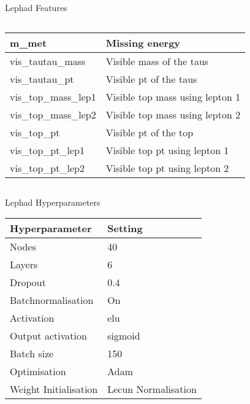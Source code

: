\begin{frame}{Lephad Features}
\begin{columns}
\begin{column}{0.5\textwidth}
{\begin{tabular}{|l|l|}
                 m\_met                & Missing energy                \\ \hline
                 vis\_tautau\_mass     & Visible mass of the taus                  \\ \hline
                 vis\_tautau\_pt       & Visible pt of the taus                 \\ \hline
                 vis\_top\_mass\_lep1  & Visible top mass using lepton 1     \\ \hline
                 vis\_top\_mass\_lep2  & Visible top mass using lepton 2  \\ \hline
                 vis\_top\_pt          & Visible pt of the top                             \\ \hline
                 vis\_top\_pt\_lep1    & Visible top pt using lepton 1    \\ \hline
                 vis\_top\_pt\_lep2    & Visible top pt using lepton 2    \\ \hline
             \end{tabular}}
        \end{column}
    \end{columns}
\end{frame}

\begin{frame}{Lephad Hyperparameters}
    \begin{table}[]
    \begin{tabular}{|l|l|}
    \hline
    Hyperparameter          &     Setting               \\ \hline
    Nodes                   &     40                    \\ \hline
    Layers                  &     6                  \\ \hline
    Dropout                 &     0.4                  \\ \hline
    Batchnormalisation       &     On                   \\ \hline
    Activation              &     elu                  \\ \hline
    Output activation       &     sigmoid              \\ \hline
    Batch size              &     150                 \\ \hline
    Optimisation            &     Adam                 \\ \hline
    Weight Initialisation   &     Lecun Normalisation  \\ \hline
    \end{tabular}
    \end{table}
\end{frame}
  
